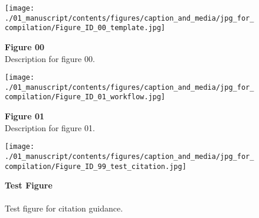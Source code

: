 
\begin{figure*}[p]
    \centering
    \texttt{[image: ./01\_manuscript/contents/figures/caption\_and\_media/jpg\_for\_compilation/Figure\_ID\_00\_template.jpg]}
    \caption{
\textbf{
Figure 00
}
\smallskip
\\
Description for figure 00.
}
    \label{fig:00_template}
\end{figure*}

\clearpage
\begin{figure*}[p]
    \centering
    \texttt{[image: ./01\_manuscript/contents/figures/caption\_and\_media/jpg\_for\_compilation/Figure\_ID\_01\_workflow.jpg]}
    \caption{
\textbf{
Figure 01
}
\smallskip
\\
Description for figure 01.
}
    \label{fig:01_workflow}
\end{figure*}

\clearpage
\begin{figure*}[p]
    \centering
    \texttt{[image: ./01\_manuscript/contents/figures/caption\_and\_media/jpg\_for\_compilation/Figure\_ID\_99\_test\_citation.jpg]}
    \caption{
\textbf{
Test Figure
}
\smallskip
\\
\smallskip\\Test figure for citation guidance.
}
    \label{fig:99_test_citation}
\end{figure*}

